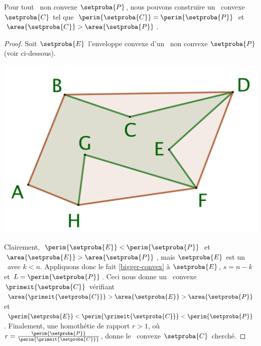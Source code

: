 

\begin{fact} \label{must-be-conv}
    Pour tout \ngone\ non convexe $\setproba{P}$,
    nous pouvons construire un \ngone\ convexe $\setproba{C}$ tel que
    $\perim{\setproba{C}} = \perim{\setproba{P}}$
    et
    $\area{\setproba{C}} > \area{\setproba{P}}$.
\end{fact}


\begin{proof}
    Soit $\setproba{E}$ l'enveloppe convexe d'un \ngone\ non convexe $\setproba{P}$ (voir ci-dessous).

    \begin{center}
        \centering
        \small\itshape
        \includegraphics[scale=.2]{content/polygon/sol-must-be/convex-hull.png}
    \end{center}

    Clairement,
    $\perim{\setproba{E}} < \perim{\setproba{P}}$
    et
    $\area{\setproba{E}} > \area{\setproba{P}}$,
    mais
    $\setproba{E}$ est un \kgone\ avec $k < n$.
    Appliquons donc le fait \ref{bigger-convex} à $\setproba{E}$, $s = n - k$ et $L = \perim{\setproba{P}}$.
    Ceci nous donne un \ngone\ convexe $\primeit{\setproba{C}}$ vérifiant
    $ \area{\primeit{\setproba{C}}} > \area{\setproba{E}} > \area{\setproba{P}}$
    et
    $\perim{\setproba{E}} < \perim{\primeit{\setproba{C}}} < \perim{\setproba{P}}$.
    Finalement, une homothétie de rapport $r > 1$, où $r = \frac{ \perim{\setproba{P}} }{ \perim{\primeit{\setproba{C}}} }$, donne le \ngone\ convexe $\setproba{C}$ cherché.

    \null\vspace{-5ex}
\end{proof}


